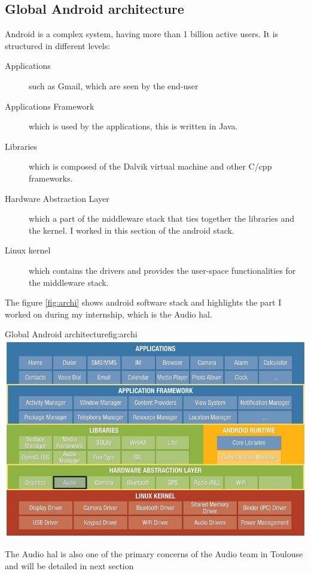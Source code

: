 \subsection{Global Android architecture}
Android is a complex system, having more than 1 billion active users.
It is structured in different levels:

\begin{description}
    \item[Applications] such as Gmail, which are seen by the end-user
    \item[Applications Framework] which is used by the applications, this is written in Java.
    \item[Libraries] which is composed of the Dalvik virtual machine and other C/\gls{cpp} frameworks.
    \item[Hardware Abstraction Layer] which a part of the middleware stack that ties together the libraries
        and the \gls{kernel}. I worked in this section of the \gls{android} stack.
    \item[Linux kernel] which contains the drivers and provides the user-space functionalities for the
        middleware stack.
\end{description}

The figure \ref{fig:archi} shows android software stack and highlights the
part I worked on during my internship, which is the Audio \gls{hal}.

\begin{figureGraphics}{Global Android architecture}{fig:archi}
    \includegraphics[width=\textwidth]{./src/img/android-archi-audio-hal.jpeg}
\end{figureGraphics}

The Audio \gls{hal} is also one of the primary concerns of the Audio team in Toulouse and will be detailed
in next section


